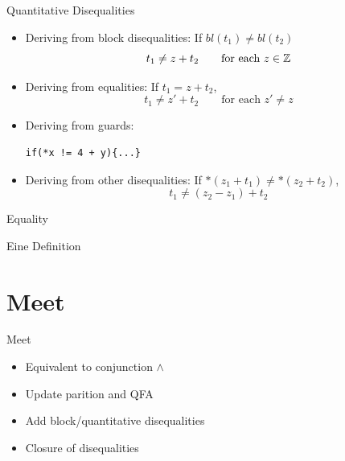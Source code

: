 \documentclass{beamer}
\begin{document}
\begin{frame}[containsverbatim]{Quantitative Disequalities}
    \begin{itemize}
        \item Deriving from block disequalities: If $bl(t_1) \neq bl(t_2)$
     \[
     t_1\neq z+ t_2 \quad\quad \text{for each $z \in \mathbb{Z}$}
     \]
        \item Deriving from equalities: If $t_1 = z + t_2$,
        \[
        t_1\neq z' + t_2 \quad\quad \text{for each $z' \neq z$}
        \]

\item Deriving from guards:
\begin{verbatim}
if(*x != 4 + y){...}
\end{verbatim}
\item Deriving from other disequalities: If $*(z_1 + t_1) \neq *(z_2 + t_2)$,
 \[ t_1 \neq (z_2 - z_1) + t_2
\]
    \end{itemize}
\end{frame}


\begin{frame}{Equality}
    \begin{Definition}
        Eine Definition
    \end{Definition}
\end{frame}

\section{Meet}
\begin{frame}{Meet}
    \begin{itemize}

    \item Equivalent to conjunction $\land$
    \item Update parition and QFA
    \item Add block/quantitative disequalities
    \item Closure of disequalities

\end{itemize}
\end{frame}
\end{document}
